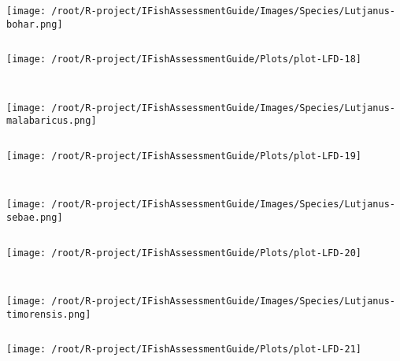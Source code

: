 \documentclass{report}\usepackage[]{graphicx}\usepackage[]{color}
\makeatletter
\def\maxwidth{ %
  \ifdim\Gin@nat@width>\linewidth
    \linewidth
  \else
    \Gin@nat@width
  \fi
}
\newenvironment{kframe}{%
 \def\at@end@of@kframe{}%
 \ifinner\ifhmode%
  \def\at@end@of@kframe{\end{minipage}}%
  \begin{minipage}{\columnwidth}%
 \fi\fi%
 \def\FrameCommand##1{\hskip\@totalleftmargin \hskip-\fboxsep
 \colorbox{shadecolor}{##1}\hskip-\fboxsep
     \hskip-\linewidth \hskip-\@totalleftmargin \hskip\columnwidth}%
 \MakeFramed {\advance\hsize-\width
   \@totalleftmargin\z@ \linewidth\hsize
   \@setminipage}}%
 {\par\unskip\endMakeFramed%
 \at@end@of@kframe}
\newenvironment{knitrout}{}{} %
\makeatother
\begin{document}
\begin{knitrout}
\begin{kframe}
\begin{verbatim}
\end{verbatim}
\end{kframe}
\texttt{[image: /root/R-project/IFishAssessmentGuide/Images/Species/Lutjanus-bohar.png]}
\begin{kframe}\begin{verbatim}
\end{verbatim}
\end{kframe}
\texttt{[image: /root/R-project/IFishAssessmentGuide/Plots/plot-LFD-18]} 
\begin{kframe}\begin{verbatim}
 
\end{verbatim}
\end{kframe}
\texttt{[image: /root/R-project/IFishAssessmentGuide/Images/Species/Lutjanus-malabaricus.png]}
\begin{kframe}\begin{verbatim}
\end{verbatim}
\end{kframe}
\texttt{[image: /root/R-project/IFishAssessmentGuide/Plots/plot-LFD-19]} 
\begin{kframe}\begin{verbatim}
 
\end{verbatim}
\end{kframe}
\texttt{[image: /root/R-project/IFishAssessmentGuide/Images/Species/Lutjanus-sebae.png]}
\begin{kframe}\begin{verbatim}
\end{verbatim}
\end{kframe}
\texttt{[image: /root/R-project/IFishAssessmentGuide/Plots/plot-LFD-20]} 
\begin{kframe}\begin{verbatim}
 
\end{verbatim}
\end{kframe}
\texttt{[image: /root/R-project/IFishAssessmentGuide/Images/Species/Lutjanus-timorensis.png]}
\begin{kframe}\begin{verbatim}
\end{verbatim}
\end{kframe}
\texttt{[image: /root/R-project/IFishAssessmentGuide/Plots/plot-LFD-21]} 
\begin{kframe}\begin{verbatim}
 

\end{verbatim}
\end{kframe}
\end{knitrout}
\end{document}
